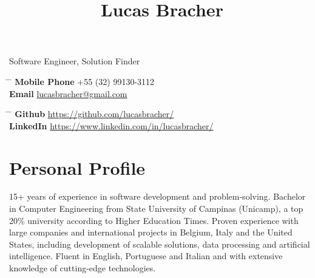\documentclass[10pt]{article} %
\begin{document}

\title{Lucas Bracher}{Software Engineer, Solution Finder} %


\parbox{0.5\textwidth}{ %
\begin{tabbing} %
\hspace{3cm} \= \hspace{4cm} \= \kill %
{\bf Mobile Phone} \> +55 (32) 99130-3112 \\ %
{\bf Email} \> \href{mailto:lucasbracher@gmail.com}{lucasbracher@gmail.com} \\ %
\end{tabbing}}
\hfill %
\parbox{0.5\textwidth}{ %
\begin{tabbing} %
\hspace{3cm} \= \hspace{4cm} \= \kill %
{\bf Github} \> \href{https://github.com/lucasbracher/}{https://github.com/lucasbracher/} \\ %
{\bf LinkedIn} \> \href{https://www.linkedin.com/in/lucasbracher/}{https://www.linkedin.com/in/lucasbracher/} \\ %
\end{tabbing}}


\section{Personal Profile}

15+ years of experience in software development and problem-solving. Bachelor in Computer Engineering from State University of Campinas (Unicamp), a top 20\% university according to Higher Education Times. Proven experience with large companies and international projects in Belgium, Italy and the United States, including development of scalable solutions, data processing and artificial intelligence. Fluent in English, Portuguese and Italian and with extensive knowledge of cutting-edge technologies.
\end{document}
